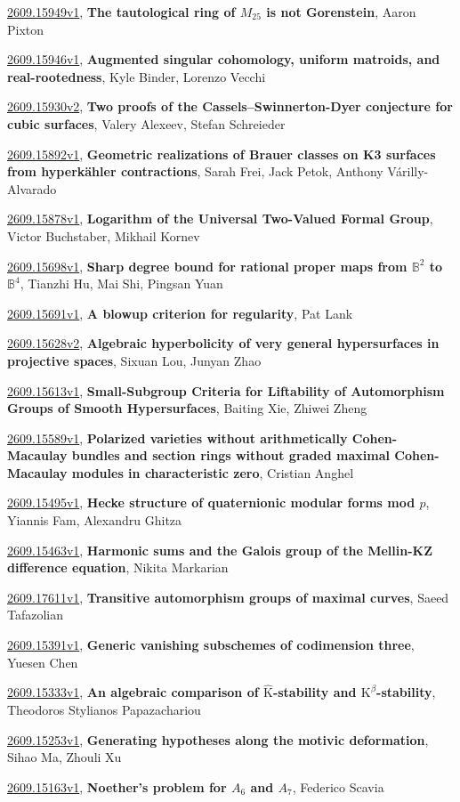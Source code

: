 \documentclass[9pt, a4paper]{article}
\theoremstyle{plain}
\theoremstyle{definition}
\theoremstyle{remark}
\newcommand{\arxiv}[3]{\href{https://arxiv.org/abs/#1}{#1}, \textbf{\textcolor{arxivblue}{#2}}, #3}
\begin{document}
\arxiv{2609.15949v1}{The tautological ring of $M_{25}$ is not Gorenstein}{Aaron Pixton}

\arxiv{2609.15946v1}{Augmented singular cohomology, uniform matroids, and real-rootedness}{Kyle Binder, Lorenzo Vecchi}

\arxiv{2609.15930v2}{Two proofs of the Cassels--Swinnerton-Dyer conjecture for cubic surfaces}{Valery Alexeev, Stefan Schreieder}

\arxiv{2609.15892v1}{Geometric realizations of Brauer classes on K3 surfaces from hyperkähler contractions}{Sarah Frei, Jack Petok, Anthony Várilly-Alvarado}

\arxiv{2609.15878v1}{Logarithm of the Universal Two-Valued Formal Group}{Victor Buchstaber, Mikhail Kornev}

\arxiv{2609.15698v1}{Sharp degree bound for rational proper maps from $\mathbb B^2$ to $\mathbb B^4$}{Tianzhi Hu, Mai Shi, Pingsan Yuan}

\arxiv{2609.15691v1}{A blowup criterion for regularity}{Pat Lank}

\arxiv{2609.15628v2}{Algebraic hyperbolicity of very general hypersurfaces in projective spaces}{Sixuan Lou, Junyan Zhao}

\arxiv{2609.15613v1}{Small-Subgroup Criteria for Liftability of Automorphism Groups of Smooth Hypersurfaces}{Baiting Xie, Zhiwei Zheng}

\arxiv{2609.15589v1}{Polarized varieties without arithmetically Cohen-Macaulay bundles and section rings without graded maximal Cohen-Macaulay modules in characteristic zero}{Cristian Anghel}

\arxiv{2609.15495v1}{Hecke structure of quaternionic modular forms mod $p$}{Yiannis Fam, Alexandru Ghitza}

\arxiv{2609.15463v1}{Harmonic sums and the Galois group of the Mellin-KZ difference equation}{Nikita Markarian}

\arxiv{2609.17611v1}{Transitive automorphism groups of maximal curves}{Saeed Tafazolian}

\arxiv{2609.15391v1}{Generic vanishing subschemes of codimension three}{Yuesen Chen}

\arxiv{2609.15333v1}{An algebraic comparison of $\widehat{\mathrm K}$-stability and $\mathrm K^β$-stability}{Theodoros Stylianos Papazachariou}

\arxiv{2609.15253v1}{Generating hypotheses along the motivic deformation}{Sihao Ma, Zhouli Xu}

\arxiv{2609.15163v1}{Noether's problem for $A_6$ and $A_7$}{Federico Scavia}
\end{document}
